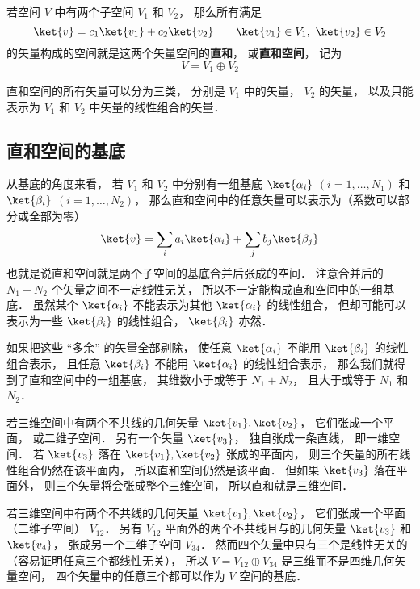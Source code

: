 

若空间 $V$ 中有两个子空间 $V_1$ 和 $V_2$， 那么所有满足
\begin{equation}
\ket{v} = c_1 \ket{v_1} + c_2 \ket{v_2}
\qquad
\ket{v_1} \in V_1,\ \ket{v_2} \in V_2
\end{equation}
的矢量构成的空间就是这两个矢量空间的\textbf{直和}， 或\textbf{直和空间}， 记为
\begin{equation}
V = V_1 \oplus V_2
\end{equation}

直和空间的所有矢量可以分为三类， 分别是 $V_1$ 中的矢量， $V_2$ 的矢量， 以及只能表示为 $V_1$ 和 $V_2$ 中矢量的线性组合的矢量．

\subsection{直和空间的基底}
从基底的角度来看， 若 $V_1$ 和 $V_2$ 中分别有一组基底 $\ket{\alpha_i}$ $(i = 1, \dots, N_1)$ 和 $\ket{\beta_i}$ $(i = 1, \dots, N_2)$， 那么直和空间中的任意矢量可以表示为（系数可以部分或全部为零）
\begin{equation}
\ket{v} = \sum_i a_i \ket{\alpha_i} + \sum_j b_j \ket{\beta_j}
\end{equation}
也就是说直和空间就是两个子空间的基底合并后张成的空间． 注意合并后的 $N_1 + N_2$ 个矢量之间不一定线性无关， 所以不一定能构成直和空间中的一组基底． 虽然某个 $\ket{\alpha_i}$ 不能表示为其他 $\ket{\alpha_i}$ 的线性组合， 但却可能可以表示为一些 $\ket{\beta_i}$ 的线性组合， $\ket{\beta_i}$ 亦然．

如果把这些 “多余” 的矢量全部剔除， 使任意 $\ket{\alpha_i}$ 不能用 $\ket{\beta_i}$ 的线性组合表示， 且任意 $\ket{\beta_i}$ 不能用 $\ket{\alpha_i}$ 的线性组合表示， 那么我们就得到了直和空间中的一组基底， 其维数小于或等于 $N_1 + N_2$， 且大于或等于 $N_1$ 和 $N_2$．

\begin{example}{}\label{DirSum_ex1}
若三维空间中有两个不共线的几何矢量 $\ket{v_1}, \ket{v_2}$， 它们张成一个平面， 或二维子空间． 另有一个矢量 $\ket{v_3}$， 独自张成一条直线， 即一维空间． 若 $\ket{v_3}$ 落在 $\ket{v_1}, \ket{v_2}$ 张成的平面内， 则三个矢量的所有线性组合仍然在该平面内， 所以直和空间仍然是该平面． 但如果 $\ket{v_3}$ 落在平面外， 则三个矢量将会张成整个三维空间， 所以直和就是三维空间．
\end{example}

\begin{example}{}\label{DirSum_ex2}
若三维空间中有两个不共线的几何矢量 $\ket{v_1}, \ket{v_2}$， 它们张成一个平面（二维子空间） $V_{12}$． 另有 $V_{12}$ 平面外的两个不共线且与的几何矢量 $\ket{v_3}$ 和 $\ket{v_4}$， 张成另一个二维子空间 $V_{34}$． 然而四个矢量中只有三个是线性无关的（容易证明任意三个都线性无关）， 所以 $V = V_{12} \oplus V_{34}$ 是三维而不是四维几何矢量空间， 四个矢量中的任意三个都可以作为 $V$ 空间的基底．
\end{example}
